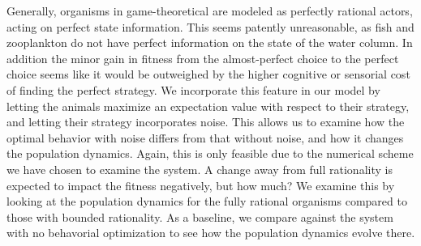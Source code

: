 Generally, organisms in game-theoretical are modeled as perfectly rational actors, acting on perfect state information. This seems patently unreasonable, as fish and zooplankton do not have perfect information on the state of the water column. In addition the minor gain in fitness from the almost-perfect choice to the perfect choice seems like it would be outweighed by the higher cognitive or sensorial cost of finding the perfect strategy.
 We incorporate this feature in our model by letting the animals maximize an expectation value with respect to their strategy, and letting their strategy incorporates noise. This allows us to examine how the optimal behavior with noise differs from that without noise, and how it changes the population dynamics. Again, this is only feasible due to the numerical scheme we have chosen to examine the system. A change away from full rationality is expected to impact the fitness negatively, but how much? We examine this by looking at the population dynamics for the fully rational organisms compared to those with bounded rationality. As a baseline, we compare against the system with no behavorial optimization to see how the population dynamics evolve there.











